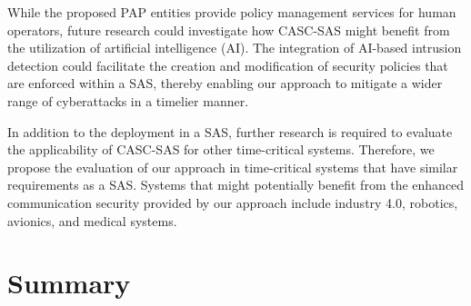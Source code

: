 While the proposed PAP entities provide policy management services for human operators, future research could investigate how CASC-SAS might benefit from the utilization of artificial intelligence (AI).
The integration of AI-based intrusion detection could facilitate the creation and modification of security policies that are enforced within a SAS, thereby enabling our approach to mitigate a wider range of cyberattacks in a timelier manner.

In addition to the deployment in a SAS, further research is required to evaluate the applicability of CASC-SAS for other time-critical systems.
Therefore, we propose the evaluation of our approach in time-critical systems that have similar requirements as a SAS.
Systems that might potentially benefit from the enhanced communication security provided by our approach include industry 4.0, robotics, avionics, and medical systems.

\section{Summary}
\label{sec:conclusion:summary}
